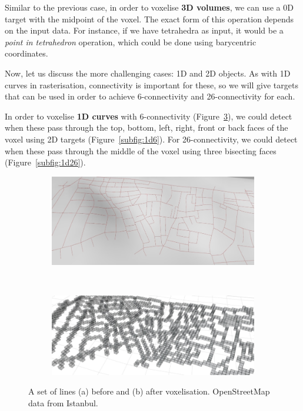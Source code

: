 Similar to the previous case, in order to voxelise \textbf{3D volumes}, we can use a 0D target with the midpoint of the voxel.
The exact form of this operation depends on the input data.
For instance, if we have tetrahedra as input, it would be a \emph{point in tetrahedron} operation, which could be done using barycentric coordinates.

Now, let us discuss the more challenging cases: 1D and 2D objects.
As with 1D curves in rasterisation, connectivity is important for these, so we will give targets that can be used in order to achieve 6-connectivity and 26-connectivity for each.

In order to voxelise \textbf{1D curves} with 6-connectivity (Figure~\ref{fig:lines}), we could detect when these pass through the top, bottom, left, right, front or back faces of the voxel using 2D targets (Figure~\ref{subfig:1d6}).
For 26-connectivity, we could detect when these pass through the middle of the voxel using three bisecting faces (Figure~\ref{subfig:1d26}).

\begin{figure}
\centering
\begin{subfigure}[b]{\linewidth}
\includegraphics[width=\linewidth]{figs/lines-pre}
\caption{}%
\label{subfig:lines-pre}
\end{subfigure}
\\
\begin{subfigure}[b]{\linewidth}
\includegraphics[width=\linewidth]{figs/lines-post}
\caption{}%
\label{subfig:lines-post}
\end{subfigure}
\caption{A set of lines (a) before and (b) after voxelisation. OpenStreetMap data from Istanbul.}%
\label{fig:lines}
\end{figure}

